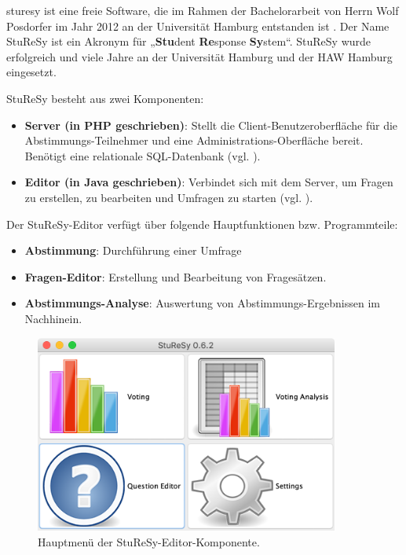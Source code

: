 \ac{sturesy} ist eine freie Software, die im Rahmen der Bachelorarbeit von Herrn Wolf Posdorfer im Jahr 2012 an der Universität Hamburg entstanden ist \cite{sturesy}. Der Name StuReSy ist ein Akronym für „\textbf{Stu}dent \textbf{Re}sponse \textbf{Sy}stem“. StuReSy wurde erfolgreich und viele Jahre an der Universität Hamburg und der HAW Hamburg eingesetzt.

StuReSy besteht aus zwei Komponenten:
\begin{itemize}
    \item \textbf{Server (in PHP geschrieben)}: Stellt die Client-Benutzeroberfläche für die Abstimmungs-Teilnehmer und eine Administrations-Oberfläche bereit. Benötigt eine relationale SQL-Datenbank (vgl. \cite{web:sturesy_server_github}).
    \item \textbf{Editor (in Java geschrieben)}: Verbindet sich mit dem Server, um Fragen zu erstellen, zu bearbeiten und Umfragen zu starten (vgl. \cite{web:sturesy_client_github}).
\end{itemize}


Der StuReSy-Editor verfügt über folgende Hauptfunktionen bzw. Programmteile:
\begin{itemize}
    \item \textbf{Abstimmung}: Durchführung einer Umfrage
    \item \textbf{Fragen-Editor}: Erstellung und Bearbeitung von Fragesätzen.
    \item \textbf{Abstimmungs-Analyse}: Auswertung von Abstimmungs-Ergebnissen im Nachhinein.
\end{itemize}

\begin{figure}[H]
    \includegraphics[width=10cm]{chapter/bewertung/bilder/StuReSy_Hauptmenue.png}
    \centering
    \caption{Hauptmenü der StuReSy-Editor-Komponente.}
    \label{abb:sturesy_hauptmenue}
\end{figure}


